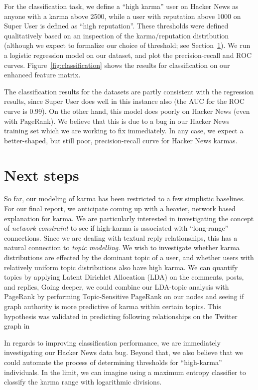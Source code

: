 \documentclass[10pt]{article}
\begin{document}
For the classification task, we define a ``high karma'' user on Hacker News as
anyone with a karma above 2500, while a user with reputation above 1000 on Super
User is defined as ``high reputation''. These thresholds were defined
qualitatively based on an inspection of the karma/reputation distribution
(although we expect to formalize our choice of threshold; see
Section~\ref{sec:next-steps}). We run a logistic regression model on our dataset,
and plot the precision-recall and ROC curves. Figure~\ref{fig:classification}
shows the results for classification on our enhanced feature matrix.

The classification results for the datasets are partly consistent with the
regression results, since Super User does well in this instance also (the AUC
for the ROC curve is 0.99). On the other hand, this model does poorly on Hacker
News (even with PageRank). We believe that this is due to a bug in our Hacker News
training set which we are working to fix immediately. In any case, we
expect a better-shaped, but still poor, precision-recall curve for Hacker News
karmas.

\section{Next steps}
\label{sec:next-steps}
So far, our modeling of karma has been restricted to a few simplistic baselines.
For our final report, we anticipate coming up with a heavier, network based
explanation for karma. We are particularly interested in investigating the concept of
\emph{network constraint} to see if high-karma is associated with ``long-range''
connections. Since we are dealing with textual reply relationships, this has a natural
connection to \textit{topic modelling}. We wish to investigate whether karma
distributions are effected by the dominant topic of a user, and whether users with
relatively uniform topic distributions also have high karma. We can quantify
topics by applying Latent Dirichlet Allocation (LDA) \citep{blei2003latent}
on the comments, posts, and replies, Going deeper, we could combine our LDA-topic analysis with PageRank by
performing Topic-Sensitive PageRank \citep{haveliwala2002topic} on our nodes
and seeing if graph authority is more predictive of karma within certain
topics. This hypothesis was validated in predicting following relationships
on the Twitter graph in \citet{weng2010twitterrank}

In regards to improving classification performance, we are immediately
investigating our Hacker News data bug. Beyond that, we also believe that
we could automate the process of determining thresholds for ``high-karma''
individuals. In the limit, we can imagine using a maximum entropy classifier
to classify the karma range with logarithmic divisions.
\end{document}
